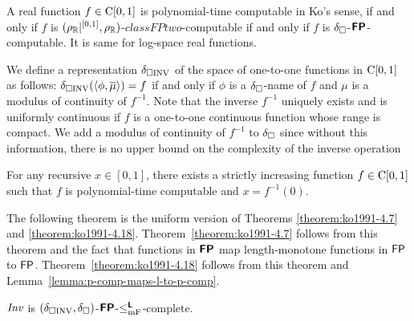 \documentclass[envcountsame,orivec,oribibl]{llncs}
\begin{document}
A real function $f \in \mathrm C[0,1]$ is polynomial-time computable in Ko's sense,
if and only if $f$ is $(\rho _\mathbb R|^{[0,1]}, \rho _\mathbb R)$-$classFPtwo$-computable
if and only if $f$ is $\delta _\square$-$\text{\bfseries \sffamily \upshape FP}$-computable.
It is same for log-space real functions.


We define a representation $\delta _{\square \mathrm{INV}}$ of the space of 
one-to-one functions in $\mathrm C[0,1]$ as follows:
$\delta _{\square \mathrm{INV}}(\langle \phi, \overline{\mu} \rangle) = f$ 
if and only if $\phi$ is a $\delta _\square$-name of $f$ 
and $\mu$ is a modulus of continuity of $f^{-1}$.
Note that the inverse $f^{-1}$ uniquely exists and is uniformly continuous
if $f$ is a one-to-one continuous function whose range is compact.
We add a modulus of continuity of $f^{-1}$ to $\delta _\square$
since without this information, there is no upper bound on 
the complexity of the inverse operation 
\begin{theorem}
For any recursive $x \in [0, 1]$, 
there exists a strictly increasing function $f \in \mathrm C[0, 1]$ 
such that $f$ is polynomial-time computable and $x = f^{-1}(0)$.
\end{theorem}

The following theorem is the uniform version of Theorems 
\ref{theorem:ko1991-4.7} and 
\ref{theorem:ko1991-4.18}.
Theorem~\ref{theorem:ko1991-4.7} follows from this theorem and the fact that
functions in $\text{\bfseries \sffamily \upshape FP}$ map length-monotone functions in $\mathsf{FP}$ to $\mathsf{FP}$.
Theorem~\ref{theorem:ko1991-4.18} follows from this theorem and Lemma~\ref{lemma:p-comp-maps-l-to-p-comp}.


\begin{theorem}
 \label{theorem:INV-is-P-complete}
 $\mathit{Inv}$ is $(\delta _{\square \mathrm{INV}}, \delta _\square)$-$\text{\bfseries \sffamily \upshape FP}$-$\leq _{\mathrm{mF}} ^{\text{\bfseries \sffamily \upshape L}}$-complete.
\end{theorem}
\end{document}
